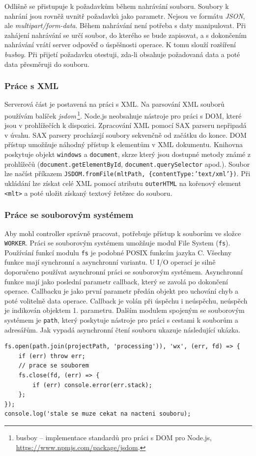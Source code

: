 Odlišně se přistupuje k požadavkům během nahrávání souboru. Soubory k nahrání jsou rovněž uvnitř požadavků jako parametr. Nejsou ve formátu \textit{JSON}, ale \textit{multipart/form-data}. Během nahrávání není potřeba s daty manipulovat. Při zahájení nahrávání se určí soubor, do kterého se bude zapisovat, a s dokončením nahrávání vrátí server odpověď o úspěšnosti operace. K tomu slouží rozšíření \textit{busboy}. Při přijetí požadavku otestuji, zda-li obsahuje požadovaná data a poté data přesměruji do souboru.

\subsubsection{Práce s XML}
Serverová část je postavená na práci s XML. Na parsování XML souborů používám balíček \textit{jsdom}\,\footnote{busboy -- implementace standardů pro práci s DOM pro Node.js, \url{https://www.npmjs.com/package/jsdom}.}. Node.js neobsahuje nástroje pro práci s DOM, které jsou v prohlížečích k dispozici. Zpracování XML pomocí SAX parseru nepřipadá v úvahu. SAX parsery procházejí soubory sekvenčně od začátku do konce. DOM přístup umožňuje náhodný přístup k elementům v XML dokumentu. Knihovna poskytuje objekt \texttt{windows} a \texttt{document}, skrze který jsou dostupné metody známé z prohlížečů (\texttt{document.getElementById}, \texttt{document.querySelector} apod.). Soubor lze načíst příkazem \texttt{JSDOM.fromFile(mltPath, \{contentType:'text/xml'\})}. Při ukládání lze získat celé XML pomocí atributu \texttt{outerHTML} na kořenový element \texttt{<mlt>} a poté uložit získaný textový řetězec do souboru.

\subsubsection{Práce se souborovým systémem}
Aby mohl controller správně pracovat, potřebuje přístup k souborům ve složce \texttt{WORKER}. Práci se souborovým systémem umožňuje modul File System (\texttt{fs}). Používání funkcí modulu \texttt{fs} je podobné POSIX funkcím jazyka C. Všechny funkce mají synchronní a asynchronní variantu. U I/O operací je silně doporučeno používat asynchronní práci se souborovým systémem. Asynchronní funkce mají jako poslední parametr callback, který se zavolá po dokončení operace. Callbacku je jako první parametr předán objekt pro uchování chyb a poté volitelně data operace. Callback je volán při úspěchu i neúspěchu, neúspěch je indikován objektem 1. parametru. Dalším modulem spojeným se souborovým systémem je \texttt{path}, který poskytuje nástroje pro práci s cestami k souborům a adresářům. Jak vypadá asynchronní čtení souboru ukazuje následující ukázka.
\begin{lstlisting}[style=JavaScript]
fs.open(path.join(projectPath, 'processing')), 'wx', (err, fd) => {
    if (err) throw err;
    // prace se souborem
    fs.close(fd, (err) => {
        if (err) console.error(err.stack);
    };
});
console.log('stale se muze cekat na nacteni souboru);
\end{lstlisting}

